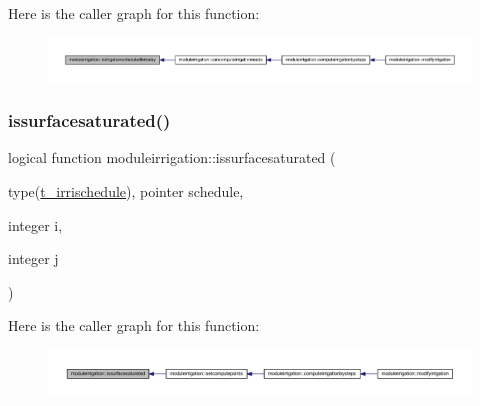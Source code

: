 Here is the caller graph for this function\+:\nopagebreak
\begin{figure}[H]
\begin{center}
\leavevmode
\includegraphics[width=350pt]{namespacemoduleirrigation_aac246bcb2688c75d66da1daaa6234e3f_icgraph}
\end{center}
\end{figure}
\mbox{\label{namespacemoduleirrigation_aac6fd8245bfb3f2dff30adb8ac0e5d2d}} 
\subsubsection{\texorpdfstring{issurfacesaturated()}{issurfacesaturated()}}
{\footnotesize\ttfamily logical function moduleirrigation\+::issurfacesaturated (\begin{DoxyParamCaption}\item[{type(\mbox{\hyperlink{structmoduleirrigation_1_1t__irrischedule}{t\+\_\+irrischedule}}), pointer}]{schedule,  }\item[{integer}]{i,  }\item[{integer}]{j }\end{DoxyParamCaption})\hspace{0.3cm}{\ttfamily [private]}}

Here is the caller graph for this function\+:\nopagebreak
\begin{figure}[H]
\begin{center}
\leavevmode
\includegraphics[width=350pt]{namespacemoduleirrigation_aac6fd8245bfb3f2dff30adb8ac0e5d2d_icgraph}
\end{center}
\end{figure}
\mbox{\label{namespacemoduleirrigation_acef69ff6504c99d5478be81efeab79fe}} 
